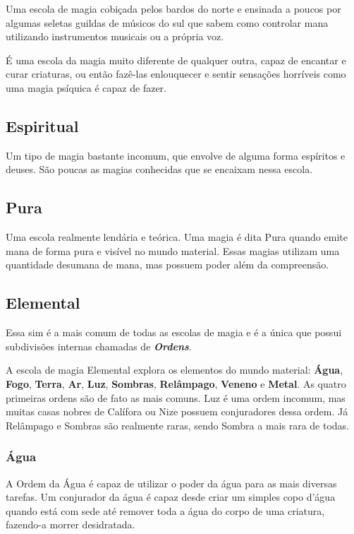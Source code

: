 \documentclass{RPG_Adventure}[2021/10/20]
\begin{document}
\begin{multicols}{2}
Uma escola de magia cobiçada pelos bardos do norte e ensinada a poucos por
algumas seletas guildas de músicos do sul que sabem como controlar mana
utilizando instrumentos musicais ou a própria voz.

É uma escola da magia muito diferente de qualquer outra, capaz de encantar e
curar criaturas, ou então fazê-las enlouquecer e sentir sensações horríveis como
uma magia psíquica é capaz de fazer.

\subsection*{Espiritual}%

Um tipo de magia bastante incomum, que envolve de alguma forma espíritos e
deuses. São poucas as magias conhecidas que se encaixam nessa escola.

\subsection*{Pura}%

Uma escola realmente lendária e teórica. Uma magia é dita Pura quando emite mana
de forma pura e visível no mundo material. Essas magias utilizam uma quantidade
desumana de mana, mas possuem poder além da compreensão.

\subsection*{Elemental}%

Essa sim é a mais comum de todas as escolas de magia e é a única que possui
subdivisões internas chamadas de \textit{\textbf{Ordens}}.

A escola de magia Elemental explora os elementos do mundo material:
\textbf{Água}, \textbf{Fogo}, \textbf{Terra}, \textbf{Ar}, \textbf{Luz},
\textbf{Sombras}, \textbf{Relâmpago}, \textbf{Veneno} e \textbf{Metal}. As
quatro primeiras ordens são de fato as mais comuns. Luz é uma ordem incomum, mas
muitas casas nobres de Calífora ou Nize possuem conjuradores dessa ordem. Já
Relâmpago e Sombras são realmente raras, sendo Sombra a mais rara de todas.

\subsubsection{Água}%

A Ordem da Água é capaz de utilizar o poder da água para as mais diversas
tarefas. Um conjurador da água é capaz desde criar um simples copo d'água quando
está com sede até remover toda a água do corpo de uma criatura, fazendo-a morrer
desidratada.


\end{multicols}
\end{document}
